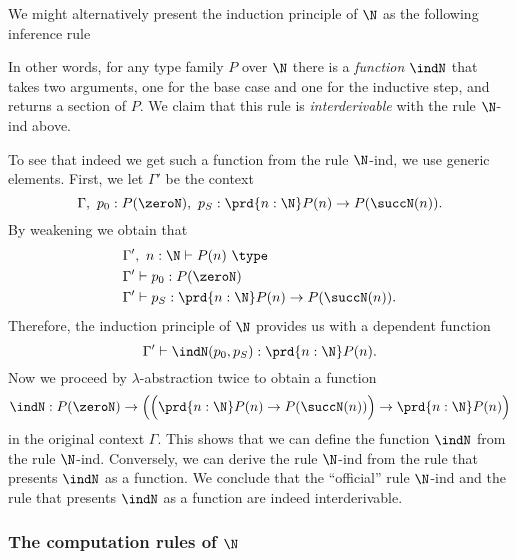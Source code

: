 \begin{rmk}
  We might alternatively present the induction principle of $\N$ as the following inference rule
  \begin{prooftree}
  \end{prooftree}
  In other words, for any type family $P$ over $\N$ there is a \emph{function} $\indN$ that takes two arguments, one for the base case and one for the inductive step, and returns a section of $P$. We claim that this rule is \emph{interderivable} with the rule $\N$-ind above.
  
  To see that indeed we get such a function from the rule $\N$-ind, we use generic elements. First, we let $\Gamma'$ be the context
  \begin{equation*}
    \Gamma,~p_0:P(\zeroN),~p_S:\prd{n:\N}P(n)\to P(\succN(n)).
  \end{equation*}
  By weakening we obtain that
  \begin{align*}
    & \Gamma',~n:\N\vdash P(n)~\type \\
    & \Gamma'\vdash p_0 : P(\zeroN) \\
    & \Gamma'\vdash p_S : \prd{n:\N}P(n)\to P(\succN(n)).
  \end{align*}
  Therefore, the induction principle of $\N$ provides us with a dependent function
  \begin{equation*}
    \Gamma' \vdash \indN(p_0,p_S) : \prd{n:\N}P(n).
  \end{equation*}
  Now we proceed by $\lambda$-abstraction twice to obtain a function
  \begin{equation*}
    \indN : P(\zeroN)\to \Big(\Big(\prd{n:\N}P(n)\to P(\succN(n))\Big) \to \prd{n:\N}P(n)\Big)
  \end{equation*}
  in the original context $\Gamma$. This shows that we can define the function $\indN$ from the rule $\N$-ind. Conversely, we can derive the rule $\N$-ind from the rule that presents $\indN$ as a function. We conclude that the ``official'' rule $\N$-ind and the rule that presents $\indN$ as a function are indeed interderivable.
\end{rmk}

\subsubsection{The computation rules of $\N$}

